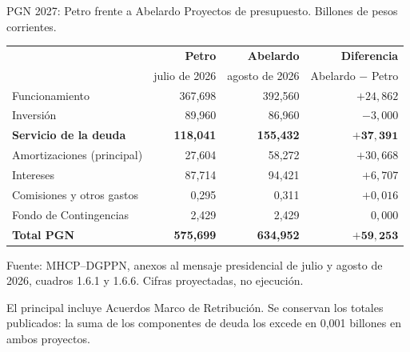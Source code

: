 \begin{frame}{PGN 2027: Petro frente a Abelardo}
{\small Proyectos de presupuesto. Billones de pesos corrientes.}
\vspace{0.12cm}
\begin{center}
\begingroup
\fontsize{10.2}{12.2}\selectfont
\setlength{\tabcolsep}{7pt}
\renewcommand{\arraystretch}{1.12}
\begin{tabular}{@{}lrrr@{}}
\toprule
 & \textbf{Petro} & \textbf{Abelardo} & \textbf{Diferencia} \\
 & julio de 2026 & agosto de 2026 & Abelardo $-$ Petro \\
\midrule
Funcionamiento & 367,698 & 392,560 & $+24{,}862$ \\
Inversión & 89,960 & 86,960 & $-3{,}000$ \\
\addlinespace[3pt]
\textbf{Servicio de la deuda} & \textbf{118,041} & \textbf{155,432} & $\mathbf{+37{,}391}$ \\
\quad Amortizaciones (principal) & 27,604 & 58,272 & $+30{,}668$ \\
\quad Intereses & 87,714 & 94,421 & $+6{,}707$ \\
\quad Comisiones y otros gastos & 0,295 & 0,311 & $+0{,}016$ \\
\quad Fondo de Contingencias & 2,429 & 2,429 & $0{,}000$ \\
\midrule
\textbf{Total PGN} & \textbf{575,699} & \textbf{634,952} & $\mathbf{+59{,}253}$ \\
\bottomrule
\end{tabular}
\endgroup
\end{center}
\vspace{-0.06cm}
{\fontsize{7.2}{8.6}\selectfont
Fuente: MHCP--DGPPN, anexos al mensaje presidencial de julio y agosto de 2026,
cuadros 1.6.1 y 1.6.6. Cifras proyectadas, no ejecución.\par
El principal incluye Acuerdos Marco de Retribución. Se conservan los totales publicados:
la suma de los componentes de deuda los excede en 0,001 billones en ambos proyectos.\par}
\end{frame}
